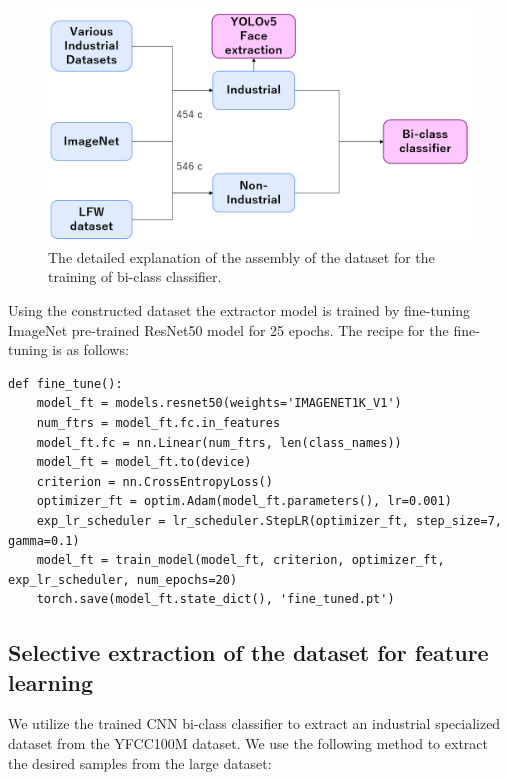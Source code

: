 \begin{figure}[t]
	\begin{center}
		\includegraphics[width=1.0\linewidth]{Chapter_4/bi_class_prep.png}
	\end{center}
	\caption{The detailed explanation of the assembly of the dataset for the training of bi-class classifier.}
	\label{fig:bi_class_prep}
\end{figure}

Using the constructed dataset the extractor model is trained by fine-tuning ImageNet pre-trained ResNet50 model for 25 epochs. The recipe for the fine-tuning is as follows:

\begin{lstlisting}
def fine_tune():
	model_ft = models.resnet50(weights='IMAGENET1K_V1')
	num_ftrs = model_ft.fc.in_features
	model_ft.fc = nn.Linear(num_ftrs, len(class_names))
	model_ft = model_ft.to(device)
	criterion = nn.CrossEntropyLoss()
	optimizer_ft = optim.Adam(model_ft.parameters(), lr=0.001)
	exp_lr_scheduler = lr_scheduler.StepLR(optimizer_ft, step_size=7, gamma=0.1)
	model_ft = train_model(model_ft, criterion, optimizer_ft, exp_lr_scheduler, num_epochs=20)
	torch.save(model_ft.state_dict(), 'fine_tuned.pt')
\end{lstlisting}

\subsection{Selective extraction of the dataset for feature learning}
We utilize the trained CNN bi-class classifier to extract an industrial specialized dataset from the YFCC100M\cite{yfcc100m} dataset. We use the following method to extract the desired samples from the large dataset:


